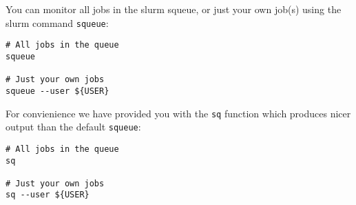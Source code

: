 \begin{note}

You can monitor all jobs in the slurm squeue, or just your own job(s) using the slurm command \texttt{squeue}:

\begin{lstlisting}
# All jobs in the queue
squeue

# Just your own jobs
squeue --user ${USER}
\end{lstlisting}

For convienience we have provided you with the \texttt{sq} function which produces nicer output than the default \texttt{squeue}:

\begin{lstlisting}
# All jobs in the queue
sq

# Just your own jobs
sq --user ${USER}
\end{lstlisting}

\end{note}

